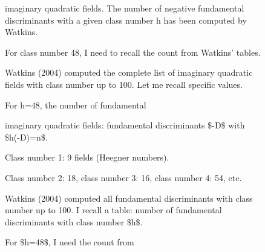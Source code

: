 \begin{figure}[t]
\noindent
\begin{reasoncol}[equal height group=reasX2]
  \par\vspace{1pt}
  \caret{}\par\vspace{4pt}
  \raggedright {} imaginary quadratic fields. The number of negative fundamental discriminants with a given class number h has been computed by Watkins.\par
  For class number 48, I need to recall the count from Watkins' tables.\par
  Watkins (2004) computed the complete list of imaginary quadratic fields with class number up to 100. Let me recall specific values.\par
  For h=48, the number of fundamental\par\vspace{3pt}\elide
\end{reasoncol}\hspace{\columnsep}%
\vspace{12pt}
\begin{reasoncol}[equal height group=reasX2]
  \par\vspace{1pt}
  \caret{}\par\vspace{4pt}
  \raggedright {} imaginary quadratic fields: fundamental discriminants \$-D\$ with \$h(-D)=n\$.\par
  Class number 1: 9 fields (Heegner numbers).\par
  Class number 2: 18, class number 3: 16, class number 4: 54, etc.\par
  Watkins (2004) computed all fundamental discriminants with class number up to 100. I recall a table: number of fundamental discriminants with class number \$h\$.\par
  For \$h=48\$, I need the count from\par\vspace{3pt}\elide
\end{reasoncol}\hspace{\columnsep}%
\begin{reasoncol}[equal height group=reasX2]
  \par\vspace{1pt}
  \caret{}\par\vspace{4pt}

\end{reasoncol}
\end{figure}
